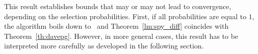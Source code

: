 This result establishes bounds that may or may not lead to convergence, depending on the selection probabilities. First, if all probabilities are equal to $1$, the algorithm boils down to \dave~and Theorem~\ref{lm:spy_diff} coincides with Theorem~\ref{th:davepg}. However, in more general cases, this result has to be interpreted more carefully as developed in the following section.
